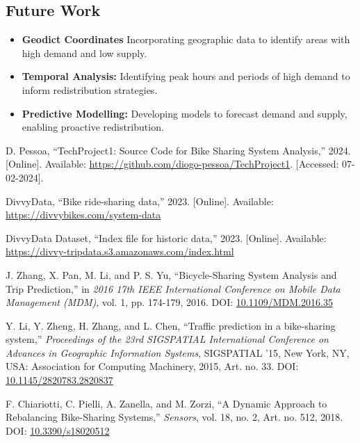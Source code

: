 \documentclass[12pt, a4paper]{article}
\begin{document}
    \subsection{Future Work}\label{subsec:future-work}
    \begin{itemize}
        \item \textbf{Geodict Coordinates} Incorporating geographic data to identify areas with high demand and low supply.
        \item \textbf{Temporal Analysis:} Identifying peak hours and periods of high demand to inform redistribution strategies.
        \item \textbf{Predictive Modelling:} Developing models to forecast demand and supply, enabling proactive redistribution.
    \end{itemize}
    \begin{thebibliography}{24}

        D. Pessoa, ``TechProject1: Source Code for Bike Sharing System Analysis,'' 2024.
        [Online].
        Available: \url{https://github.com/diogo-pessoa/TechProject1}.
        [Accessed: 07-02-2024].

        DivvyData, ``Bike ride-sharing data,'' 2023.
        [Online].
        Available: \url{https://divvybikes.com/system-data}

        DivvyData Dataset, ``Index file for historic data,'' 2023.
        [Online].
        Available: \url{https://divvy-tripdata.s3.amazonaws.com/index.html}

        J. Zhang, X. Pan, M. Li, and P. S. Yu, ``Bicycle-Sharing System Analysis and Trip Prediction,'' in \textit{2016 17th IEEE International Conference on Mobile Data Management (MDM)}, vol.
        1, pp.
        174-179, 2016.
        DOI: \href{https://doi.org/10.1109/MDM.2016.35}{10.1109/MDM.2016.35}

        Y. Li, Y. Zheng, H. Zhang, and L. Chen, ``Traffic prediction in a bike-sharing system,'' \textit{Proceedings of the 23rd SIGSPATIAL International Conference on Advances in Geographic Information Systems}, SIGSPATIAL '15, New York, NY, USA: Association for Computing Machinery, 2015, Art.
        no.
        33.
        DOI: \href{https://doi.org/10.1145/2820783.2820837}{10.1145/2820783.2820837}

        F. Chiariotti, C. Pielli, A. Zanella, and M. Zorzi, ``A Dynamic Approach to Rebalancing Bike-Sharing Systems,'' \textit{Sensors}, vol.
        18, no.
                2, Art.
                no.
                512, 2018.
                DOI: \href{https://www.mdpi.com/1424-8220/18/2/512}{10.3390/s18020512}

    \end{thebibliography}
\end{document}
